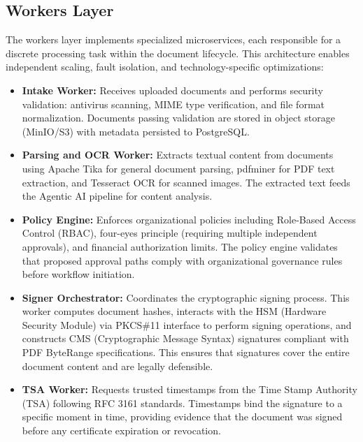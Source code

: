 \documentclass[12pt,oneside,openright,a4paper]{cpe-english-project}
\begin{document}
\vspace{1em}

\subsection{Workers Layer}

The workers layer implements specialized microservices, each responsible for a discrete processing task within the document lifecycle. This architecture enables independent scaling, fault isolation, and technology-specific optimizations:

\begin{itemize}
\item \textbf{Intake Worker:} Receives uploaded documents and performs security validation: antivirus scanning, MIME type verification, and file format normalization. Documents passing validation are stored in object storage (MinIO/S3) with metadata persisted to PostgreSQL.

\item \textbf{Parsing and OCR Worker:} Extracts textual content from documents using Apache Tika for general document parsing, pdfminer for PDF text extraction, and Tesseract OCR for scanned images. The extracted text feeds the Agentic AI pipeline for content analysis.

\item \textbf{Policy Engine:} Enforces organizational policies including Role-Based Access Control (RBAC), four-eyes principle (requiring multiple independent approvals), and financial authorization limits. The policy engine validates that proposed approval paths comply with organizational governance rules before workflow initiation.

\item \textbf{Signer Orchestrator:} Coordinates the cryptographic signing process. This worker computes document hashes, interacts with the HSM (Hardware Security Module) via PKCS\#11 interface to perform signing operations, and constructs CMS (Cryptographic Message Syntax) signatures compliant with PDF ByteRange specifications. This ensures that signatures cover the entire document content and are legally defensible.

\item \textbf{TSA Worker:} Requests trusted timestamps from the Time Stamp Authority (TSA) following RFC 3161 standards. Timestamps bind the signature to a specific moment in time, providing evidence that the document was signed before any certificate expiration or revocation.


\end{itemize}
\end{document}
